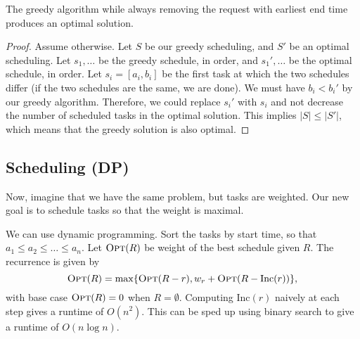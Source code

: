 \begin{theorem}
\lemlabel

The greedy algorithm while always removing the request with earliest end time produces an optimal solution.
\end{theorem}

\begin{proof}
Assume otherwise. Let $S$ be our greedy scheduling, and $S'$ be an optimal scheduling. Let $s_1, \hdots$ be the greedy schedule, in order, and $s_1', \hdots$ be the optimal schedule, in order. Let $s_i = [a_i, b_i]$ be the first task at which the two schedules differ (if the two schedules are the same, we are done). We must have $b_i < b_i'$ by our greedy algorithm. Therefore, we could replace $s_i'$ with $s_i$ and not decrease the number of scheduled tasks in the optimal solution. This implies $\vert S\vert \leq \vert S'\vert$, which means that the greedy solution is also optimal. 
\end{proof}

\subsection{Scheduling (DP)}

Now, imagine that we have the same problem, but tasks are weighted. Our new goal is to schedule tasks so that the weight is maximal. 

\hrulebar

We can use dynamic programming. Sort the tasks by start time, so that $a_1\leq a_2\leq \hdots \leq a_n$. Let $\textsc{Opt}(R)$ be weight of the best schedule given $R$. The recurrence is given by
\[\textsc{Opt}(R) = \max\{\textsc{Opt}(R-r), w_r + \textsc{Opt}(R-\text{Inc}(r))\},\]
with base case $\textsc{Opt}(R)=0$ when $R=\emptyset$. Computing $\text{Inc}(r)$ naively at each step gives a runtime of $O(n^2)$. This can be sped up using binary search to give a runtime of $O(n\log n)$. 

